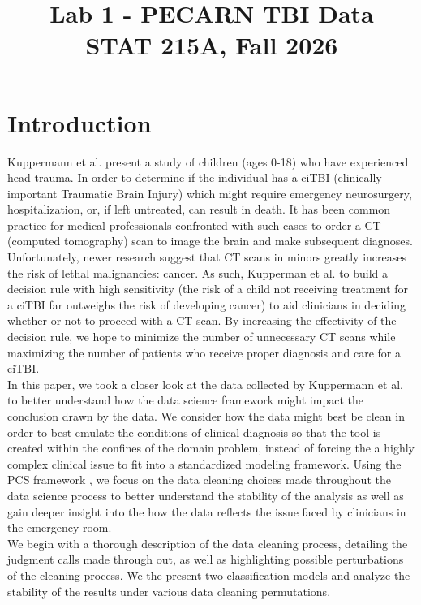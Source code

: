 \documentclass[10pt,letterpaper]{article}
\title{Lab 1 - PECARN TBI Data\\
\large{STAT 215A, Fall 2026} }
\begin{document}
\maketitle

\section{Introduction}\label{introduction}

Kuppermann et al.\cite{kuppermann_identification_2009} present a study of children (ages 0-18) who have experienced head trauma. In order to determine if the individual has a ciTBI (clinically-important Traumatic Brain Injury) which might require emergency neurosurgery, hospitalization, or, if left untreated, can result in death. It has been common practice for medical professionals confronted with such cases to order a CT (computed tomography) scan to image the brain and make subsequent diagnoses. Unfortunately, newer research suggest that CT scans in minors greatly increases the risk of lethal malignancies: cancer. As such, Kupperman et al. to build a decision rule with high sensitivity (the risk of a child not receiving treatment for a ciTBI far outweighs the risk of developing cancer) to aid clinicians in deciding whether or not to proceed with a CT scan.  By increasing the effectivity of the decision rule, we hope to minimize the number of unnecessary CT scans while maximizing the number of patients who receive proper diagnosis and care for a ciTBI.\\

In this paper, we took a closer look at the data collected by Kuppermann et al. to better understand how the data science framework might impact the conclusion drawn by the data. We consider how the data might best be clean in order to best emulate the conditions of clinical diagnosis so that the tool is created within the confines of the domain problem, instead of forcing the a highly complex clinical issue to fit into a standardized modeling framework. Using the PCS framework \cite{yu2024veridical}, we focus on the data cleaning choices made throughout the data science process to better understand the stability of the analysis as well as gain deeper insight into the how the data reflects the issue faced by clinicians in the emergency room. \\

We begin with a thorough description of the data cleaning process, detailing the judgment calls made through out, as well as highlighting possible perturbations of the cleaning process. We the present two classification models and analyze the stability of the results under various data cleaning permutations. 
\end{document}
